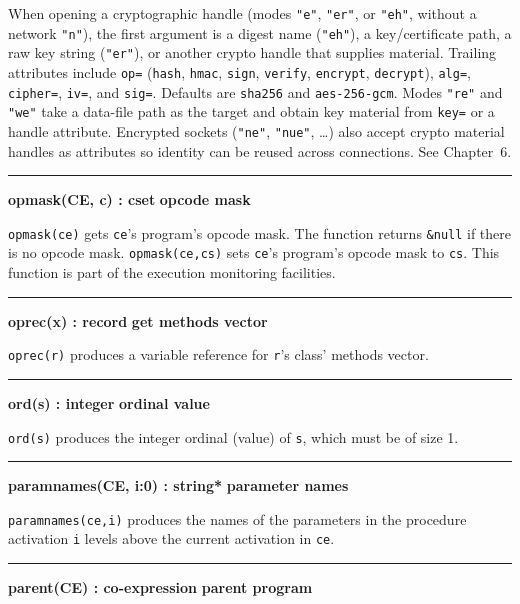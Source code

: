 When opening a cryptographic handle (modes \texttt{"e"}, \texttt{"er"},
or \texttt{"eh"}, without a network \texttt{"n"}), the first argument is
a digest name (\texttt{"eh"}), a key/certificate path, a raw key string
(\texttt{"er"}), or another crypto handle that supplies material.
Trailing attributes include \texttt{op=} (\texttt{hash}, \texttt{hmac},
\texttt{sign}, \texttt{verify}, \texttt{encrypt}, \texttt{decrypt}),
\texttt{alg=}, \texttt{cipher=}, \texttt{iv=}, and \texttt{sig=}.
Defaults are \texttt{sha256} and \texttt{aes-256-gcm}.
Modes \texttt{"re"} and \texttt{"we"} take a data-file path as the
target and obtain key material from \texttt{key=} or a handle attribute.
Encrypted sockets (\texttt{"ne"}, \texttt{"nue"}, \ldots) also accept
crypto material handles as attributes so identity can be reused across
connections. See Chapter~6.

\bigskip\hrule\vspace{0.1cm}
\noindent
{\bf opmask(CE, c) : cset } \hfill {\bf opcode mask}

\noindent
\texttt{opmask(ce)} gets \texttt{ce}'s
program's opcode mask. The function returns
\texttt{\&null} if there is no opcode mask. \texttt{opmask(ce,cs)} sets
\texttt{ce}'s program's opcode mask
to \texttt{cs}. This function is part of the execution monitoring
facilities.

\bigskip\hrule\vspace{0.1cm}
\noindent
{\bf oprec(x) : record } \hfill {\bf get methods vector}

\noindent
\texttt{oprec(r)} produces a variable reference for
\texttt{r}'s class' methods vector.

\bigskip\hrule\vspace{0.1cm}
\noindent
{\bf ord(s) : integer } \hfill {\bf ordinal value}

\noindent
{}\texttt{ord(s)} produces the integer ordinal
(value) of \texttt{s}, which must be of size 1.

\bigskip\hrule\vspace{0.1cm}
\noindent
{\bf paramnames(CE, i:0) : string* } \hfill {\bf parameter names}

\noindent
{}\texttt{paramnames(ce,i)} produces the names of
the parameters in the procedure activation \texttt{i} levels above the
current activation in \texttt{ce}.

\bigskip\hrule\vspace{0.1cm}
\noindent
{\bf parent(CE) : co{}-expression } \hfill {\bf parent program}

